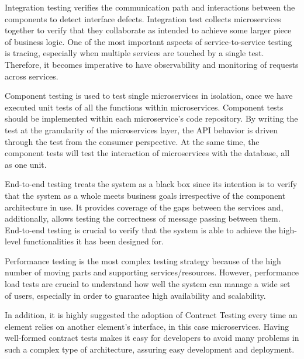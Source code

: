 Integration testing verifies the communication path and interactions between the components to detect interface defects. Integration test collects microservices together to verify that they collaborate as intended to achieve some larger piece of business logic.
One of the most important aspects of service-to-service testing is tracing, especially when multiple services are touched by a single test. Therefore, it becomes imperative to have observability and monitoring of requests across services.
\newline

Component testing is used to test single microservices in isolation, once we have executed unit tests of all the functions within microservices. Component tests should be implemented within each microservice’s code repository. By writing the test at the granularity of the microservices layer, the API behavior is driven through the test from the consumer perspective. At the same time, the component tests will test the interaction of microservices with the database, all as one unit.
\newline

End-to-end testing treats the system as a black box since its intention is to verify that the system as a whole meets business goals irrespective of the component architecture in use. It provides coverage of the gaps between the services and, additionally, allows testing the  correctness of message passing between them. End-to-end testing is crucial to verify that the system is able to achieve the high-level functionalities it has been designed for.
\newline

Performance testing is the most complex testing strategy because of the high number of moving parts and supporting services/resources. However, performance load tests are crucial to understand how well the system can manage a wide set of users, especially in order to guarantee high availability and scalability.
\newline

In addition, it is highly suggested the adoption of Contract Testing every time an element relies on another element’s interface, in this case microservices. Having well-formed contract tests makes it easy for developers to avoid many problems in such a complex type of architecture, assuring easy development and deployment.
